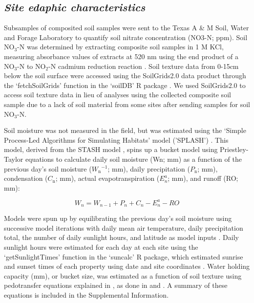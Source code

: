 \subsection{\textit{Site edaphic characteristics}}
Subsamples of composited soil samples were sent to the Texas A \& M Soil, Water and Forage Laboratory to quantify soil nitrate concentration (NO3-N; ppm). Soil NO$_{3}$-N was determined by extracting composite soil samples in 1 M KCl, measuring absorbance values of extracts at 520 nm using the end product of a NO$_{3}$-N to NO$_{2}$-N cadmium reduction reaction . Soil texture data from 0-15cm below the soil surface were accessed using the SoilGrids2.0 data product  through the ‘fetchSoilGrids’ function in the ‘soilDB’ R package . We used SoilGrids2.0 to access soil texture data in lieu of analyses using the collected composite soil sample due to a lack of soil material from some sites after sending samples for soil NO$_{3}$-N.

Soil moisture was not measured in the field, but was estimated using the ‘Simple Process-Led Algorithms for Simulating Habitats’ model ('SPLASH') . This model, derived from the STASH model , spins up a bucket model using Priestley-Taylor equations  to calculate daily soil moisture (Wn; mm) as a function of the previous day’s soil moisture ($W_\mathrm{n}{}^{-1}$; mm), daily precipitation ($P_\mathrm{n}$; mm), condensation ($C_\mathrm{n}$; mm), actual evapotranspiration ($E_{n}^a$; mm), and runoff (RO; mm):

\begin{equation}
    \label{eq_4.7}
    W_n = W_{n-1} + P_n + C_n - E_{n}^{a} - RO
\end{equation}

Models were spun up by equilibrating the previous day’s soil moisture using successive model iterations with daily mean air temperature, daily precipitation total, the number of daily sunlight hours, and latitude as model inputs . Daily sunlight hours were estimated for each day at each site using the ‘getSunlightTimes’ function in the ‘suncalc’ R package, which estimated sunrise and sunset times of each property using date and site coordinates . Water holding capacity (mm), or bucket size, was estimated as a function of soil texture using pedotransfer equations explained in , as done in  and . A summary of these equations is included in the Supplemental Information.

